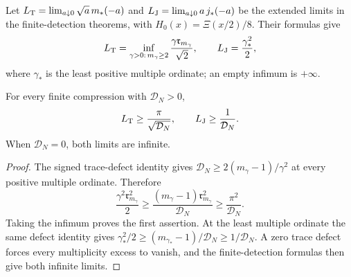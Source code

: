 Let $L_{\rm T}=\lim_{a\downarrow0}\sqrt a\,m_*(-a)$ and
$L_{\rm J}=\lim_{a\downarrow0}a\,j_*(-a)$ be the extended limits in
the finite-detection theorems, with $H_0(x)=\Xi(x/2)/8$.  Their formulas
give
\[
 L_{\rm T}=\inf_{\gamma>0:\,m_\gamma\ge2}
             \frac{\gamma\mathfrak r_{m_\gamma}}{\sqrt2},
 \qquad
 L_{\rm J}=\frac{\gamma_*^2}{2},
\]
where $\gamma_*$ is the least positive multiple ordinate; an empty
infimum is $+\infty$.

\begin{corollary}
\label{cor:trace-global-threshold}
For every finite compression with $\mathcal D_N>0$,
\[
 L_{\rm T}\ge\frac{\pi}{\sqrt{\mathcal D_N}},
 \qquad L_{\rm J}\ge\frac1{\mathcal D_N}.
\]
When $\mathcal D_N=0$, both limits are infinite.
\end{corollary}

\begin{proof}
The signed trace-defect identity gives
$\mathcal D_N\ge2(m_\gamma-1)/\gamma^2$ at every positive multiple
ordinate.  Therefore
\[
 \frac{\gamma^2\mathfrak r_{m_\gamma}^2}{2}
       \ge\frac{(m_\gamma-1)\mathfrak r_{m_\gamma}^2}{\mathcal D_N}
       \ge\frac{\pi^2}{\mathcal D_N}.
\]
Taking the infimum proves the first assertion.  At the least multiple
ordinate the same defect identity gives
$\gamma_*^2/2\ge(m_{\gamma_*}-1)/\mathcal D_N
\ge1/\mathcal D_N$.  A zero trace defect forces every multiplicity
excess to vanish, and the finite-detection formulas then give both
infinite limits.
\end{proof}
